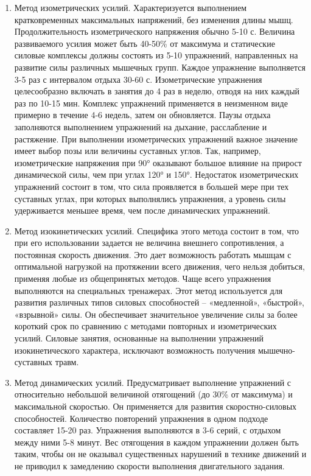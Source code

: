 \begin{enumerate}
    \item Метод изометрических усилий. Характеризуется выполнением кратковременных максимальных напряжений, без изменения длины мышц. Продолжительность изометрического напряжения обычно 5-10 с. Величина развиваемого усилия может быть 40-50\% от максимума и статические силовые комплексы должны состоять из 5-10 упражнений, направленных на развитие силы различных мышечных групп. Каждое упражнение выполняется 3-5 раз с интервалом отдыха 30-60 с. Изометрические упражнения целесообразно включать в занятия до 4 раз в неделю, отводя на них каждый раз по 10-15 мин. Комплекс упражнений применяется в неизменном виде примерно в течение 4-6 недель, затем он обновляется. Паузы отдыха заполняются выполнением упражнений на дыхание, расслабление и растяжение. При выполнении изометрических упражнений важное значение имеет выбор позы или величины суставных углов. Так, например, изометрические напряжения при 90° оказывают большое влияние на прирост динамической силы, чем при углах 120° и 150°. Недостаток изометрических упражнений состоит в том, что сила проявляется в большей мере при тех суставных углах, при которых выполнялись упражнения, а уровень силы удерживается меньшее время, чем после динамических упражнений.
    \item Метод изокинетических усилий. Специфика этого метода состоит в том, что при его использовании задается не величина внешнего сопротивления, а постоянная скорость движения. Это дает возможность работать мышцам с оптимальной нагрузкой на протяжении всего движения, чего нельзя добиться, применяя любые из общепринятых методов. Чаще всего упражнения выполняются на специальных тренажерах. Этот метод используется для развития различных типов силовых способностей – «медленной», «быстрой», «взрывной» силы. Он обеспечивает значительное увеличение силы за более короткий срок по сравнению с методами повторных и изометрических усилий. Силовые занятия, основанные на выполнении упражнений изокинетического характера, исключают возможность получения мышечно-суставных травм.
    \item Метод динамических усилий. Предусматривает выполнение упражнений с относительно небольшой величиной отягощений (до 30\% от максимума) и максимальной скоростью. Он применяется для развития скоростно-силовых способностей. Количество повторений упражнения в одном подходе составляет 15-20 раз. Упражнения выполняются в 3-6 серий, с отдыхом между ними 5-8 минут. Вес отягощения в каждом упражнении должен быть таким, чтобы он не оказывал существенных нарушений в технике движений и не приводил к замедлению скорости выполнения двигательного задания.

\end{enumerate}
